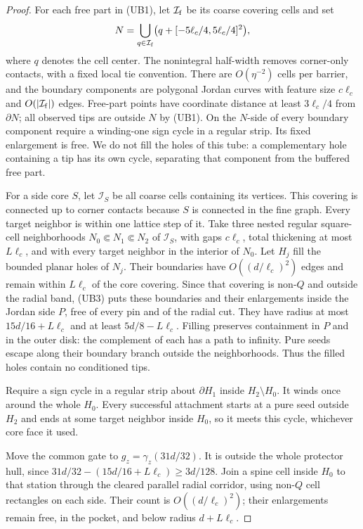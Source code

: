\begin{proof}
For each free part in (UB1), let \(\mathcal I_{\rm f}\) be its
coarse covering cells and set
\[
 N=\bigcup_{q\in\mathcal I_{\rm f}}
                 \bigl(q+[-5\ell_c/4,5\ell_c/4]^2\bigr),
\]
where \(q\) denotes the cell center.  The nonintegral half-width
removes corner-only contacts, with a fixed local tie convention.
There are \(O(\eta^{-2})\) cells per barrier, and the boundary
components are polygonal Jordan curves with feature size \(c\ell_c\)
and \(O(|\mathcal I_{\rm f}|)\) edges.  Free-part points have
coordinate distance at least \(3\ell_c/4\) from \(\partial N\); all
observed tips are outside \(N\) by (UB1).  On the \(N\)-side of
every boundary component require a winding-one sign cycle in a
regular strip.  Its fixed enlargement is free.  We do not fill
the holes of this tube: a complementary hole containing a tip has
its own cycle, separating that component from the buffered free part.

For a side core \(S\), let \(\mathcal I_S\) be all coarse cells
containing its vertices.  This covering is connected up to corner
contacts because \(S\) is connected in the fine graph.  Every target
neighbor is within one lattice step of it.  Take three nested regular
square-cell neighborhoods \(N_0\Subset N_1\Subset N_2\) of
\(\mathcal I_S\), with gaps \(c\ell_c\), total thickening at most \(L\ell_c\),
and with every target neighbor in the interior of \(N_0\).
Let \(H_j\) fill the bounded planar holes of \(N_j\).
Their boundaries have \(O((d/\ell_c)^2)\) edges and remain within \(L\ell_c\)
of the core covering.  Since that covering is non-\(Q\) and outside
the radial band, (UB3) puts these boundaries and their enlargements
inside the Jordan side \(P\), free of every pin and of the radial cut.
They have radius at most \(15d/16+L\ell_c\) and at least \(5d/8-L\ell_c\).
Filling preserves containment in \(P\) and in the outer disk: the
complement of each has a path to infinity.  Pure seeds escape along
their boundary branch outside the neighborhoods.  Thus the filled
holes contain no conditioned tips.

Require a sign cycle in a regular strip about \(\partial H_1\)
inside \(H_2\setminus H_0\).  It winds once around the whole \(H_0\).
Every successful attachment starts at a pure seed outside \(H_2\)
and ends at some target neighbor inside \(H_0\), so it meets this
cycle, whichever core face it used.

Move the common gate to \(g_z=\gamma_z(31d/32)\).  It is outside
the whole protector hull, since \(31d/32-(15d/16+L\ell_c)\ge3d/128\).
Join a spine cell inside \(H_0\) to that station through the cleared
parallel radial corridor, using non-\(Q\) cell rectangles on each
side.  Their count is \(O((d/\ell_c)^2)\); their enlargements remain
free, in the pocket, and below radius \(d+L\ell_c\).


\end{proof}
